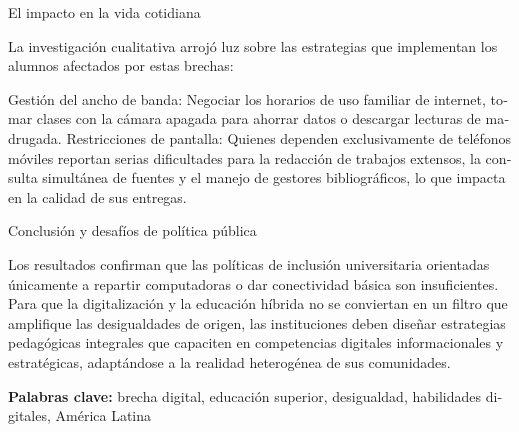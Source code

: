 \begin{tcolorbox}[colback=brown!8!white,colframe=brown!8!white,boxrule=0pt,arc=2pt,left=4pt,right=4pt,top=3pt,bottom=3pt,before skip=4pt,after skip=4pt]
\begin{otherlanguage}{spanish}
El impacto en la vida cotidiana

La investigación cualitativa arrojó luz sobre las estrategias que implementan los alumnos afectados por estas brechas:

Gestión del ancho de banda: Negociar los horarios de uso familiar de internet, tomar clases con la cámara apagada para ahorrar datos o descargar lecturas de madrugada.
Restricciones de pantalla: Quienes dependen exclusivamente de teléfonos móviles reportan serias dificultades para la redacción de trabajos extensos, la consulta simultánea de fuentes y el manejo de gestores bibliográficos, lo que impacta en la calidad de sus entregas.

Conclusión y desafíos de política pública

Los resultados confirman que las políticas de inclusión universitaria orientadas únicamente a repartir computadoras o dar conectividad básica son insuficientes. Para que la digitalización y la educación híbrida no se conviertan en un filtro que amplifique las desigualdades de origen, las instituciones deben diseñar estrategias pedagógicas integrales que capaciten en competencias digitales informacionales y estratégicas, adaptándose a la realidad heterogénea de sus comunidades.
\par\smallskip\noindent\textbf{Palabras clave:} brecha digital, educación superior, desigualdad, habilidades digitales, América Latina
\end{otherlanguage}
\end{tcolorbox}


